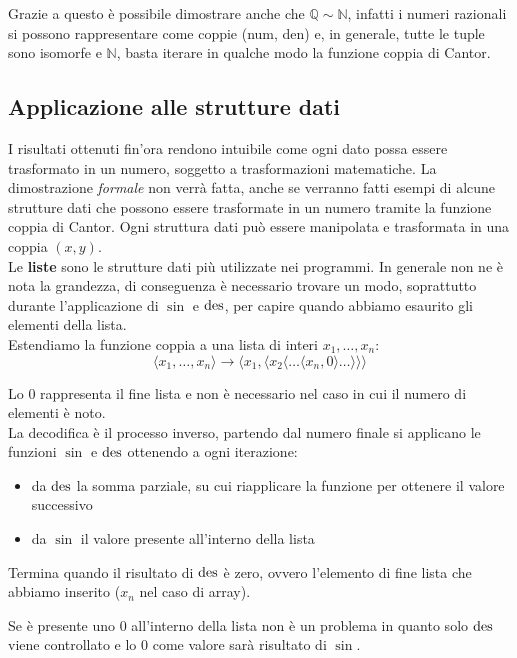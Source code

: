Grazie a questo è possibile dimostrare anche che $\mathbb{Q} \sim \mathbb{N}$, infatti i numeri razionali si possono rappresentare come coppie (num, den) e, in generale, tutte le tuple sono isomorfe e $\mathbb{N}$, basta iterare in qualche modo la funzione coppia di Cantor.\\

\subsection{Applicazione alle strutture dati}

I risultati ottenuti fin'ora rendono intuibile come ogni dato possa essere trasformato in un numero, soggetto a trasformazioni matematiche. La dimostrazione \textit{formale} non verrà fatta, anche se verranno fatti esempi di alcune strutture dati che possono essere trasformate in un numero tramite la funzione coppia di Cantor. Ogni struttura dati può essere manipolata e trasformata in una coppia $(x,y)$.\\

Le \textbf{liste} sono le strutture dati più utilizzate nei programmi. In generale non ne è nota la grandezza, di conseguenza è necessario trovare un modo, soprattutto durante l'applicazione di $\sin$ e $\operatorname{des}$, per capire quando abbiamo esaurito gli elementi della lista.\\

Estendiamo la funzione coppia a una lista di interi $x_1, \dots, x_n$:
$$ \langle x_1, \dots, x_n \rangle \rightarrow \langle x_1, \langle x_2 \langle \dots \langle x_n, 0 \rangle \dots \rangle \rangle \rangle $$

Lo $0$ rappresenta il fine lista e non è necessario nel caso in cui il numero di elementi è noto.\\

La decodifica è il processo inverso, partendo dal numero finale si applicano le funzioni $\sin$ e $\operatorname{des}$ ottenendo a ogni iterazione: 
\begin{itemize}
	\item da $\operatorname{des}$ la somma parziale, su cui riapplicare la funzione per ottenere il valore successivo
	\item da $\sin$ il valore presente all'interno della lista
\end{itemize} 
Termina quando il risultato di $\operatorname{des}$ è zero, ovvero l'elemento di fine lista che abbiamo inserito ($x_n$ nel caso di array).
\begin{center}
	
\end{center}
Se è presente uno 0 all'interno della lista non è un problema in quanto solo $\operatorname{des}$ viene controllato e lo 0 come valore sarà risultato di $\sin$.\\

